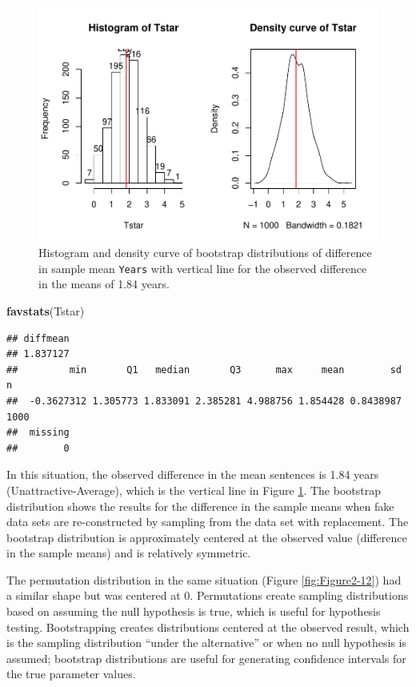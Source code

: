 \documentclass[]{book}
\newenvironment{Shaded}{\begin{snugshade}}{\end{snugshade}}
\newcommand{\KeywordTok}[1]{\textcolor[rgb]{0.13,0.29,0.53}{\textbf{#1}}}
\newcommand{\NormalTok}[1]{#1}
\begin{document}
\begin{figure}
\centering
\includegraphics{GreenwoodBanner_files/figure-latex/Figure2-18-1.pdf}
\caption{\label{fig:Figure2-18}Histogram and density curve of bootstrap distributions of
difference in sample mean \texttt{Years} with vertical line for the
observed difference in the means of 1.84 years.}
\end{figure}

\begin{Shaded}
\begin{Highlighting}[]
\KeywordTok{favstats}\NormalTok{(Tstar)}
\end{Highlighting}
\end{Shaded}

\begin{verbatim}
## diffmean 
## 1.837127 
##         min       Q1   median       Q3      max     mean        sd    n
##  -0.3627312 1.305773 1.833091 2.385281 4.988756 1.854428 0.8438987 1000
##  missing
##        0
\end{verbatim}

In this situation, the observed difference in the mean sentences is 1.84
years (Unattractive-Average), which is the vertical line in Figure
\ref{fig:Figure2-18}. The bootstrap distribution shows the results for
the difference in the sample means when fake data sets are
re-constructed by sampling from the data set with replacement. The
bootstrap distribution is approximately centered at the observed value
(difference in the sample means) and is relatively symmetric.

The permutation distribution in the same situation (Figure
\ref{fig:Figure2-12}) had a similar shape but was centered at 0.
Permutations create sampling distributions based on assuming the null
hypothesis is true, which is useful for hypothesis testing.
Bootstrapping creates distributions centered at the observed result,
which is the sampling distribution ``under the alternative'' or when no
null hypothesis is assumed; bootstrap distributions are useful for
generating confidence intervals for the true parameter values.
\end{document}

